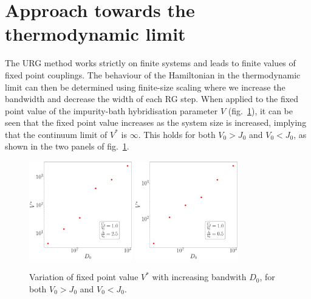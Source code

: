 \section{Approach towards the thermodynamic limit}
The URG method works strictly on finite systems and leads to finite values of fixed point couplings. The behaviour of the Hamiltonian in the thermodynamic limit can then be determined using finite-size scaling where we increase the bandwidth and decrease the width of each RG step. When applied to the fixed point value of the impurity-bath hybridisation parameter \(V\) (fig.~\ref{V_vs_D}), it can be seen that the fixed point value increases as the system size is increased, implying that the continuum limit of \(V^*\) is \(\infty\). This holds for both \(V_0 > J_0\) and \(V_0 < J_0\), as shown in the two panels of fig.~\ref{V_vs_D}.
\begin{figure}[htpb]
	\centering
	\hspace*{\fill}
	\includegraphics[width=0.4\textwidth]{../figures/Vstar_vs_D_smallV.pdf}
	\hspace*{\fill}
	\includegraphics[width=0.4\textwidth]{../figures/Vstar_vs_D_largeV.pdf}
	\hspace*{\fill}
	\caption{Variation of fixed point value \(V^*\) with increasing bandwith \(D_0\), for both \(V_0 > J_0\) and \(V_0 < J_0\).}
	\label{V_vs_D}
\end{figure}

